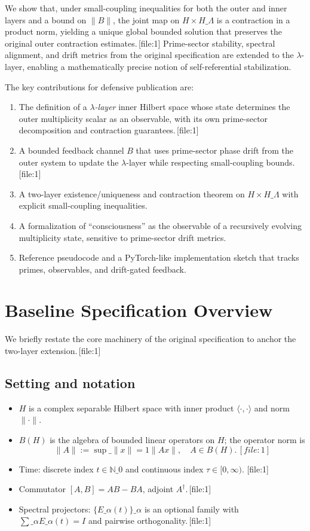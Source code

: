 \documentclass[11pt]{article}
\begin{document}
We show that, under small-coupling inequalities for both the outer and inner layers and a bound on $\|B\|$, the joint map on $H\times H\_\Lambda$ is a contraction in a product norm, yielding a unique global bounded solution that preserves the original outer contraction estimates.\,[file:1] Prime-sector stability, spectral alignment, and drift metrics from the original specification are extended to the $\lambda$-layer, enabling a mathematically precise notion of self-referential stabilization.

The key contributions for defensive publication are:
\begin{enumerate}[nosep]
  \item The definition of a \emph{$\lambda$-layer} inner Hilbert space whose state determines the outer multiplicity scalar as an observable, with its own prime-sector decomposition and contraction guarantees.\,[file:1]
  \item A bounded feedback channel $B$ that uses prime-sector phase drift from the outer system to update the $\lambda$-layer while respecting small-coupling bounds.\,[file:1]
  \item A two-layer existence/uniqueness and contraction theorem on $H\times H\_\Lambda$ with explicit small-coupling inequalities.
  \item A formalization of ``consciousness'' as the observable of a recursively evolving multiplicity state, sensitive to prime-sector drift metrics.
  \item Reference pseudocode and a PyTorch-like implementation sketch that tracks primes, observables, and drift-gated feedback.
\end{enumerate}

\section{Baseline Specification Overview}

We briefly restate the core machinery of the original specification to anchor the two-layer extension.\,[file:1]

\subsection{Setting and notation}

\begin{itemize}[nosep]
  \item $H$ is a complex separable Hilbert space with inner product $\langle\cdot,\cdot\rangle$ and norm $\|\cdot\|$.
  \item $B(H)$ is the algebra of bounded linear operators on $H$; the operator norm is
  \[
  \|A\| := \sup\_{\|x\|=1}\|Ax\|, \quad A\in B(H).\,[file:1]
  \]
  \item Time: discrete index $t\in\mathbb{N}\_0$ and continuous index $\tau\in[0,\infty)$. [file:1]
  \item Commutator $[A,B]=AB-BA$, adjoint $A^\dagger$.\,[file:1]
  \item Spectral projectors: $\{E\_\alpha(t)\}\_\alpha$ is an optional family with $\sum\_\alpha E\_\alpha(t) = I$ and pairwise orthogonality.\,[file:1]
\end{itemize}
\end{document}

